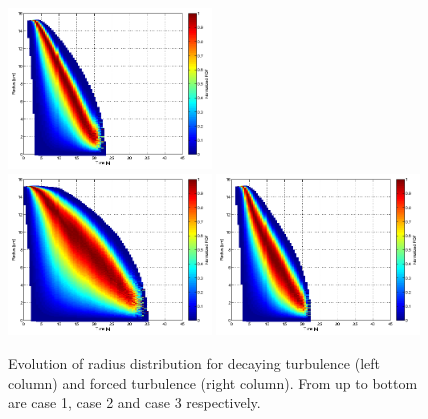 \documentclass[draft,jgrga]{AGUTeX}
\begin{document}
\begin{article}
\begin{figure}[H]
\includegraphics[width=0.48\textwidth]{Figures/pdf_radius_f2}\\
\includegraphics[width=0.48\textwidth]{Figures/pdf_radius_d3}
\includegraphics[width=0.48\textwidth]{Figures/pdf_radius_f3}
\caption{Evolution of radius distribution for decaying turbulence (left column) 
and forced turbulence (right column). From up to bottom are case 1, case 2 and case 3 respectively.}\label{fig:rad_distri}
\end{figure}


\end{article}
\end{document}
